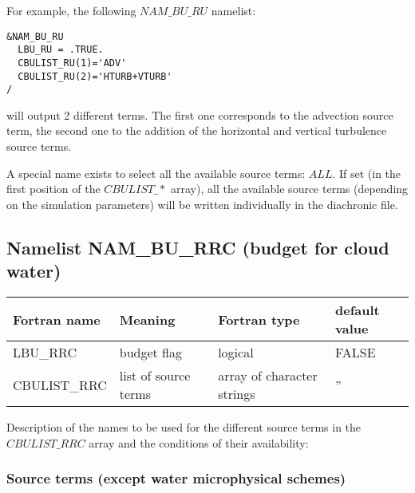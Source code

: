 For example, the following $NAM\_BU\_RU$ namelist:

\begin{verbatim}
&NAM_BU_RU
  LBU_RU = .TRUE.
  CBULIST_RU(1)='ADV'
  CBULIST_RU(2)='HTURB+VTURB'
/
\end{verbatim}

will output 2 different terms. The first one corresponds to the advection source term, the second one to the addition of the horizontal and vertical turbulence source terms.

A special name exists to select all the available source terms: $ALL$. If set (in the first position of the $CBULIST\_*$ array), all the available source terms (depending on the simulation parameters) will be written individually in the diachronic file.

\newpage
\subsection{Namelist NAM\_BU\_RRC (budget for cloud water)}

\begin{longtable} {|p{}|p{}|>{\centering}p{}|p{}<{\centering}|}
\hline
Fortran name & Meaning & Fortran type & default value \\
\hline \hline
\endhead
LBU\_RRC & budget flag & logical & FALSE\index{LBU\_RRC!\innam{NAM\_BU\_RRC}} \\\hline
CBULIST\_RRC & list of source terms & array of character strings & ''\index{CBULIST\_RRC!\innam{NAM\_BU\_RRC}} \\\hline
\end{longtable}

Description of the names to be used for the different source terms in the $CBULIST\_RRC$ array and the conditions of their availability:

\subsubsection{Source terms (except water microphysical schemes)}

